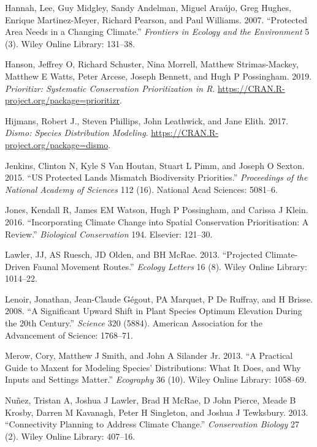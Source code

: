 \documentclass[]{article}
\begin{document}
\leavevmode\hypertarget{ref-hannah2007protected}{}%
Hannah, Lee, Guy Midgley, Sandy Andelman, Miguel Araújo, Greg Hughes, Enrique Martinez-Meyer, Richard Pearson, and Paul Williams. 2007. ``Protected Area Needs in a Changing Climate.'' \emph{Frontiers in Ecology and the Environment} 5 (3). Wiley Online Library: 131--38.

\leavevmode\hypertarget{ref-Hanson2019}{}%
Hanson, Jeffrey O, Richard Schuster, Nina Morrell, Matthew Strimas-Mackey, Matthew E Watts, Peter Arcese, Joseph Bennett, and Hugh P Possingham. 2019. \emph{Prioritizr: Systematic Conservation Prioritization in R}. \url{https://CRAN.R-project.org/package=prioritizr}.

\leavevmode\hypertarget{ref-Hijmans_Dismo}{}%
Hijmans, Robert J., Steven Phillips, John Leathwick, and Jane Elith. 2017. \emph{Dismo: Species Distribution Modeling}. \url{https://CRAN.R-project.org/package=dismo}.

\leavevmode\hypertarget{ref-jenkins2015us}{}%
Jenkins, Clinton N, Kyle S Van Houtan, Stuart L Pimm, and Joseph O Sexton. 2015. ``US Protected Lands Mismatch Biodiversity Priorities.'' \emph{Proceedings of the National Academy of Sciences} 112 (16). National Acad Sciences: 5081--6.

\leavevmode\hypertarget{ref-jones2016incorporating}{}%
Jones, Kendall R, James EM Watson, Hugh P Possingham, and Carissa J Klein. 2016. ``Incorporating Climate Change into Spatial Conservation Prioritisation: A Review.'' \emph{Biological Conservation} 194. Elsevier: 121--30.

\leavevmode\hypertarget{ref-lawler2013projected}{}%
Lawler, JJ, AS Ruesch, JD Olden, and BH McRae. 2013. ``Projected Climate-Driven Faunal Movement Routes.'' \emph{Ecology Letters} 16 (8). Wiley Online Library: 1014--22.

\leavevmode\hypertarget{ref-lenoir2008significant}{}%
Lenoir, Jonathan, Jean-Claude Gégout, PA Marquet, P De Ruffray, and H Brisse. 2008. ``A Significant Upward Shift in Plant Species Optimum Elevation During the 20th Century.'' \emph{Science} 320 (5884). American Association for the Advancement of Science: 1768--71.

\leavevmode\hypertarget{ref-merow2013practical}{}%
Merow, Cory, Matthew J Smith, and John A Silander Jr. 2013. ``A Practical Guide to Maxent for Modeling Species' Distributions: What It Does, and Why Inputs and Settings Matter.'' \emph{Ecography} 36 (10). Wiley Online Library: 1058--69.

\leavevmode\hypertarget{ref-nunez2013connectivity}{}%
Nuñez, Tristan A, Joshua J Lawler, Brad H McRae, D John Pierce, Meade B Krosby, Darren M Kavanagh, Peter H Singleton, and Joshua J Tewksbury. 2013. ``Connectivity Planning to Address Climate Change.'' \emph{Conservation Biology} 27 (2). Wiley Online Library: 407--16.
\end{document}
